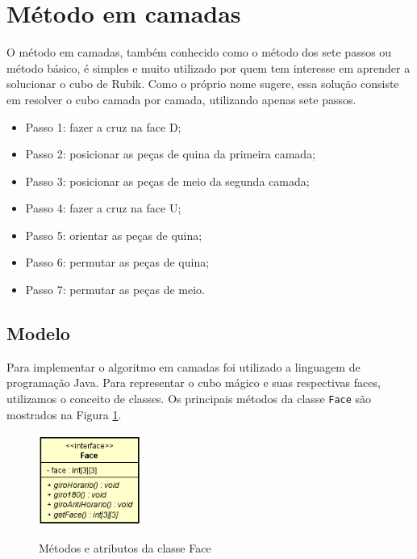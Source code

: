 \section{Método em camadas}


O método em camadas, também conhecido como o método dos sete passos ou método básico, é simples e muito utilizado por quem tem interesse em aprender a solucionar o cubo de Rubik. Como o próprio nome sugere, essa solução consiste em resolver o cubo camada por camada, utilizando apenas sete passos.

\begin{itemize}
    \item Passo 1: fazer a cruz na face D;
    \item Passo 2: posicionar as peças de quina da primeira camada;
    \item Passo 3: posicionar as peças de meio da segunda camada;
    \item Passo 4: fazer a cruz na face U;
    \item Passo 5: orientar as peças de quina;
    \item Passo 6: permutar as peças de quina;
    \item Passo 7: permutar as peças de meio.    
\end{itemize}




\subsection{Modelo}

Para implementar o algoritmo em camadas foi utilizado a linguagem de programação Java. Para representar o cubo mágico e suas respectivas faces, utilizamos o conceito de classes. Os principais métodos da classe {\tt Face} são mostrados na Figura \ref{fig:figInterfaceFace}.

\begin{figure}[!htb]
    \centering
    {
        \includegraphics[height=3cm]{imagens/InterfaceFace.png}
        \label{figFront}
    }
    
\caption{Métodos e atributos da classe Face}
\label{fig:figInterfaceFace}
\end{figure}



